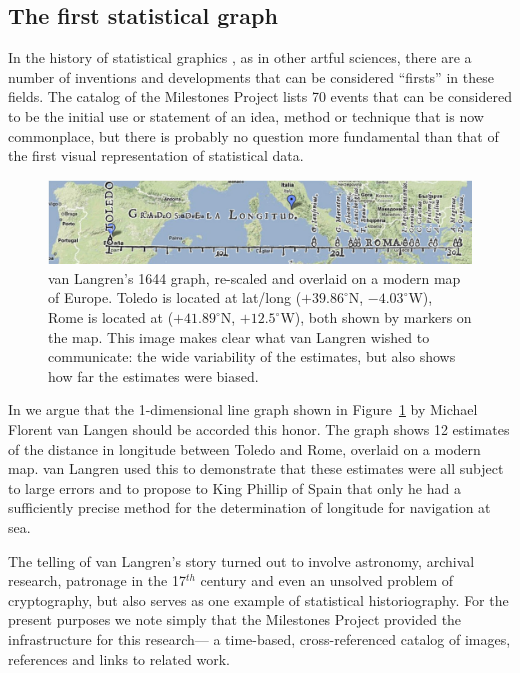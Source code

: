 \documentclass[11pt]{article}
\newcommand*{\figref}[1]{Figure~\ref{#1}}
\newcommand{\Cent}[1]{#1$^{th}$ century}
\newcommand*{\degree}[1]{\ensuremath{{#1}^{\circ}}}
\begin{document}
\subsection{The first statistical graph}
In the history of statistical graphics \citep{Friendly:06:hbook},
as in other artful sciences, there are a number of inventions and developments
that can be considered ``firsts'' in these fields.
The catalog of the Milestones Project
\citep{FriendlyDenis:01} lists 70 events that can be considered to be the
initial use or statement of an idea, method or technique that is now
commonplace, but there is probably no question more fundamental than
that of the first visual representation of statistical data.

\begin{figure}[htb]
 \centering
 \includegraphics[width=\textwidth]{fig/langren-google-overlay}
 \caption{van Langren's 1644 graph, re-scaled and overlaid on a modern map of Europe.
 Toledo is located at
lat/long
(\degree{+39.86}N, \degree{-4.03}W), Rome is located at (\degree{+41.89}N, \degree{+12.5}W),
both shown by markers on the map.  This image makes clear what van Langren wished to communicate:
the wide variability of the estimates, but also shows how far the estimates were biased.}%
  \label{fig:langren-google-overlay}
\end{figure}

In \citet{Friendly-etal:2010:langren}
we argue that the 1-dimensional line graph shown in \figref{fig:langren-google-overlay}
by Michael Florent
van Langen \citep{Langren:1644} should be accorded this honor.
The graph shows 12 estimates of the distance in longitude between Toledo and Rome, overlaid on a modern map.
van Langren used this to demonstrate that these estimates were all subject to large errors and to
propose to King Phillip of Spain that only he had a sufficiently precise method for the determination
of longitude for navigation at sea.

The telling of van Langren's story turned out to involve astronomy, archival research,
patronage in the \Cent{17} and even an unsolved problem of cryptography,
but also serves as one example of statistical historiography.  For the present purposes
we note simply that the Milestones Project provided the infrastructure for this research---
a time-based, cross-referenced catalog of images, references and links to related work.
\end{document}
